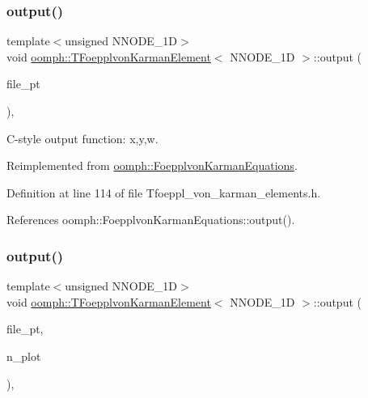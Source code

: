 \mbox{\label{classoomph_1_1TFoepplvonKarmanElement_ad6676ce8249127f37757d46b94cd1407}} 
\subsubsection{\texorpdfstring{output()}{output()}\hspace{0.1cm}{\footnotesize\ttfamily [3/4]}}
{\footnotesize\ttfamily template$<$unsigned N\+N\+O\+D\+E\+\_\+1D$>$ \\
void \hyperlink{classoomph_1_1TFoepplvonKarmanElement}{oomph\+::\+T\+Foepplvon\+Karman\+Element}$<$ N\+N\+O\+D\+E\+\_\+1D $>$\+::output (\begin{DoxyParamCaption}\item[{F\+I\+LE $\ast$}]{file\+\_\+pt }\end{DoxyParamCaption})\hspace{0.3cm}{\ttfamily [inline]}, {\ttfamily [virtual]}}



C-\/style output function\+: x,y,w. 



Reimplemented from \hyperlink{classoomph_1_1FoepplvonKarmanEquations_a19d1540525a0c822c059ce50989710a6}{oomph\+::\+Foepplvon\+Karman\+Equations}.



Definition at line 114 of file Tfoeppl\+\_\+von\+\_\+karman\+\_\+elements.\+h.



References oomph\+::\+Foepplvon\+Karman\+Equations\+::output().

\mbox{\label{classoomph_1_1TFoepplvonKarmanElement_ac3899c4e4e2ae477e5e5afec72ae4730}} 
\subsubsection{\texorpdfstring{output()}{output()}\hspace{0.1cm}{\footnotesize\ttfamily [4/4]}}
{\footnotesize\ttfamily template$<$unsigned N\+N\+O\+D\+E\+\_\+1D$>$ \\
void \hyperlink{classoomph_1_1TFoepplvonKarmanElement}{oomph\+::\+T\+Foepplvon\+Karman\+Element}$<$ N\+N\+O\+D\+E\+\_\+1D $>$\+::output (\begin{DoxyParamCaption}\item[{F\+I\+LE $\ast$}]{file\+\_\+pt,  }\item[{const unsigned \&}]{n\+\_\+plot }\end{DoxyParamCaption})\hspace{0.3cm}{\ttfamily [inline]}, {\ttfamily [virtual]}}



